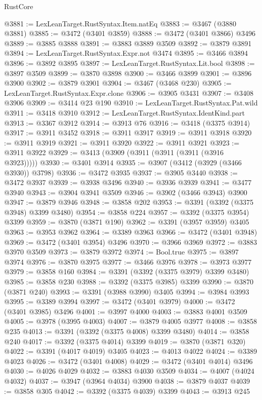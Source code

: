 \begin{lexlean}{RustCore}
\begin{coremodule}
@3881 := LexLeanTarget.RustSyntax.Item.natEq
@3883 := @3467 (@3880 @3881)
@3885 := @3472 (@3401 @3859)
@3888 := @3472 (@3401 @3866) @3496
@3889 := @3885 @3888
@3891 := @3883 @3889 @3509
@3892 := @3879 @3891
@3894 := LexLeanTarget.RustSyntax.Expr.not @3474
@3895 := @3466 @3894
@3896 := @3892 @3895
@3897 := LexLeanTarget.RustSyntax.Lit.bool
@3898 := @3897 @3509
@3899 := @3870 @3898
@3900 := @3466 @3899
@3901 := @3896 @3900
@3902 := @3879 @3901
@3904 := @3467 (@3468 @230)
@3905 := LexLeanTarget.RustSyntax.Expr.clone
@3906 := @3905 @3431
@3907 := @3408 @3906
@3909 := @3414 @23 @190
@3910 := LexLeanTarget.RustSyntax.Pat.wild
@3911 := @3418 @3910
@3912 := LexLeanTarget.RustSyntax.IdentKind.part
@3913 := @3367 @3912
@3914 := @3913 @76
@3916 := @3418 (@3375 @3914)
@3917 := @3911 @3452
@3918 := @3911 @3917
@3919 := @3911 @3918
@3920 := @3911 @3919
@3921 := @3911 @3920
@3922 := @3911 @3921
@3923 := @3911 @3922
@3929 := @3413 (@3909 (@3911 (@3911 (@3911 (@3916 @3923)))))
@3930 := @3401 @3914
@3935 := @3907 (@3412 (@3929 (@3466 @3930)) @3798)
@3936 := @3472 @3935
@3937 := @3905 @3440
@3938 := @3472 @3937
@3939 := @3938 @3496
@3940 := @3936 @3939
@3941 := @3477 @3940
@3943 := @3904 @3941 @3509
@3946 := @3902 (@3466 @3943) @3900
@3947 := @3879 @3946
@3948 := @3858 @202
@3953 := @3391 (@3392 (@3375 @3948) @3399 @3480)
@3954 := @3858 @224
@3957 := @3392 (@3375 @3954) @3399
@3959 := @3870 (@3871 @190)
@3962 := @3391 (@3957 @3959) @3405
@3963 := @3953 @3962
@3964 := @3389 @3963
@3966 := @3472 (@3401 @3948)
@3969 := @3472 (@3401 @3954) @3496
@3970 := @3966 @3969
@3972 := @3883 @3970 @3509
@3973 := @3879 @3972
@3974 := Bool.true
@3975 := @3897 @3974
@3976 := @3870 @3975
@3977 := @3466 @3976
@3978 := @3973 @3977
@3979 := @3858 @160
@3984 := @3391 (@3392 (@3375 @3979) @3399 @3480)
@3985 := @3858 @230
@3988 := @3392 (@3375 @3985) @3399
@3990 := @3870 (@3871 @240)
@3993 := @3391 (@3988 @3990) @3405
@3994 := @3984 @3993
@3995 := @3389 @3994
@3997 := @3472 (@3401 @3979)
@4000 := @3472 (@3401 @3985) @3496
@4001 := @3997 @4000
@4003 := @3883 @4001 @3509
@4005 := @3978 (@3995 @4003)
@4007 := @3879 @4005 @3977
@4008 := @3858 @235
@4013 := @3391 (@3392 (@3375 @4008) @3399 @3480)
@4014 := @3858 @240
@4017 := @3392 (@3375 @4014) @3399
@4019 := @3870 (@3871 @320)
@4022 := @3391 (@4017 @4019) @3405
@4023 := @4013 @4022
@4024 := @3389 @4023
@4026 := @3472 (@3401 @4008)
@4029 := @3472 (@3401 @4014) @3496
@4030 := @4026 @4029
@4032 := @3883 @4030 @3509
@4034 := @4007 (@4024 @4032)
@4037 := @3947 (@3964 @4034) @3900
@4038 := @3879 @4037
@4039 := @3858 @305
@4042 := @3392 (@3375 @4039) @3399
@4043 := @3913 @245

\end{coremodule}
\end{lexlean}
